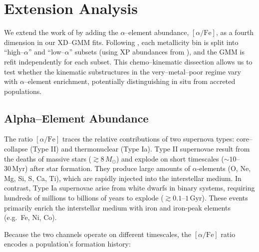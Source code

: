 \documentclass[a4paper,12pt]{article}
\begin{document}












\section{Extension Analysis}

We extend the work of \citet{zhang2024existencemetalpoordiscmilky} by adding the $\alpha$–element abundance, $[\alpha/\mathrm{Fe}]$, as a fourth dimension in our XD–GMM fits.  Following \citet{Vis2024}, each metallicity bin is split into “high–$\alpha$” and “low–$\alpha$” subsets (using XP abundances from \citealt{Li2024}), and the GMM is refit independently for each subset.  This chemo–kinematic dissection allows us to test whether the kinematic substructures in the very–metal–poor regime vary with $\alpha$–element enrichment, potentially distinguishing in situ from accreted populations.

\subsection{Alpha–Element Abundance}
\label{subsec:alpha}

The ratio $[\alpha/\mathrm{Fe}]$ traces the relative contributions of two supernova types: 
core–collapse (Type II) and thermonuclear (Type Ia). Type II supernovae result from the deaths of massive 
stars ($\gtrsim8\,M_\odot$) and explode on short timescales ($\sim10$–$30\,\mathrm{Myr}$) after star 
formation. They produce large amounts of $\alpha$-elements (O, Ne, Mg, Si, S, Ca, Ti), which are rapidly 
injected into the interstellar medium. In contrast, Type Ia supernovae arise from white dwarfs in binary 
systems, requiring hundreds of millions to billions of years to explode ($\gtrsim0.1$–$1\,\mathrm{Gyr}$). 
These events primarily enrich the interstellar medium with iron and iron-peak elements (e.g.\ Fe, Ni, Co).

Because the two channels operate on different timescales, the $[\alpha/\mathrm{Fe}]$ ratio encodes a 
population’s formation history:
\end{document}
